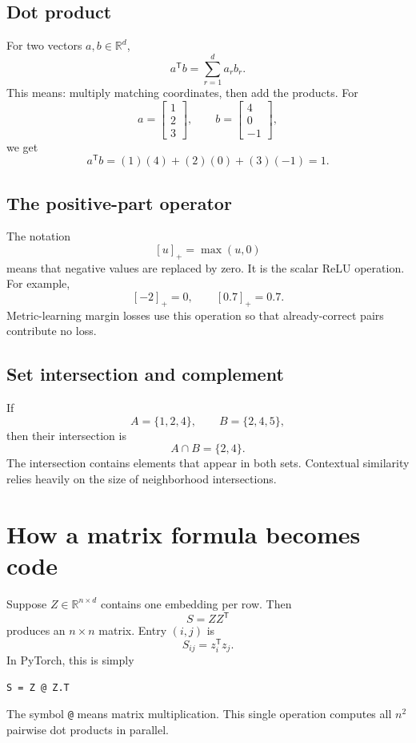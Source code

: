 \documentclass[11pt,oneside,openany]{book}
\theoremstyle{myplain}
\theoremstyle{definition}
\newcommand{\R}{\mathbb{R}}
\newcommand{\code}[1]{\texttt{#1}}
\begin{document}
\subsection{Dot product}

For two vectors $a,b\in\R^d$,
\[
  a^{\mathsf T}b=\sum_{r=1}^{d}a_rb_r.
\]
This means: multiply matching coordinates, then add the products. For
\[
  a=\begin{bmatrix}1\\2\\3\end{bmatrix},\qquad
  b=\begin{bmatrix}4\\0\\-1\end{bmatrix},
\]
we get
\[
  a^{\mathsf T}b=(1)(4)+(2)(0)+(3)(-1)=1.
\]

\subsection{The positive-part operator}

The notation
\[
  [u]_+=\max(u,0)
\]
means that negative values are replaced by zero. It is the scalar ReLU operation. For example,
\[
  [-2]_+=0,\qquad [0.7]_+=0.7.
\]
Metric-learning margin losses use this operation so that already-correct pairs contribute no loss.

\subsection{Set intersection and complement}

If
\[
A=\{1,2,4\},\qquad B=\{2,4,5\},
\]
then their intersection is
\[
  A\cap B=\{2,4\}.
\]
The intersection contains elements that appear in both sets. Contextual similarity relies heavily on the size of neighborhood intersections.

\section{How a matrix formula becomes code}

Suppose $Z\in\R^{n\times d}$ contains one embedding per row. Then
\[
  S=ZZ^{\mathsf T}
\]
produces an $n\times n$ matrix. Entry $(i,j)$ is
\[
  S_{ij}=z_i^{\mathsf T}z_j.
\]
In PyTorch, this is simply
\begin{lstlisting}
S = Z @ Z.T
\end{lstlisting}
The symbol \code{@} means matrix multiplication. This single operation computes all $n^2$ pairwise dot products in parallel.
\end{document}
